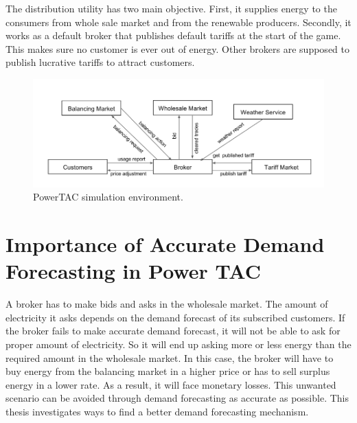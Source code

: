 The distribution utility has two main objective. First, it supplies energy to the consumers from whole sale market and from the renewable producers. Secondly, it works as a default broker that publishes default tariffs at the start of the game. This makes sure no customer is ever out of energy. Other brokers are supposed to publish lucrative tariffs to attract customers.


\begin{figure}[h]
  \includegraphics[width=\linewidth]{simulation-environment.png}
  \caption{PowerTAC simulation environment.}
  \label{fig:simulation-environment}
\end{figure}

\section{Importance of Accurate Demand Forecasting in Power TAC}
A broker has to make bids and asks in the wholesale market. The amount of electricity it asks depends on the demand forecast of its subscribed customers. If the broker fails to make accurate demand forecast, it will not be able to ask for proper amount of electricity. So it will end up asking more or less energy than the required amount in the wholesale market. In this case, the broker will have to buy energy from the balancing market in a higher price or has to sell surplus energy in a lower rate. As a result, it will face monetary losses. This unwanted scenario can be avoided through demand forecasting as accurate as possible. This thesis investigates ways to find a better demand forecasting mechanism.


